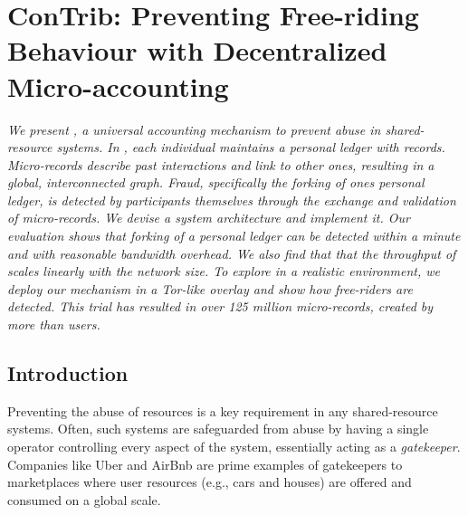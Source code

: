 \chapter{ConTrib: Preventing Free-riding Behaviour with Decentralized Micro-accounting}
\label{chapter2}

\emph{We present \ModelName{}, a universal accounting mechanism to prevent abuse in shared-resource systems.
In \ModelName{}, each individual maintains a personal ledger with \emph{records}.
Micro-records describe past interactions and link to other ones, resulting in a global, interconnected graph.
Fraud, specifically the forking of ones personal ledger, is detected by participants themselves through the exchange and validation of micro-records.
We devise a system architecture and implement it.
Our evaluation shows that forking of a personal ledger can be detected within a minute and with reasonable bandwidth overhead.
We also find that that the throughput of \ModelName{} scales linearly with the network size.
To explore \ModelName{} in a realistic environment, we deploy our mechanism in a Tor-like overlay and show how free-riders are detected.
This trial has resulted in over 125 million micro-records, created by more than \TrialUsers{} users.}

\newpage

\section{Introduction}


Preventing the abuse of resources is a key requirement in any shared-resource systems.
Often, such systems are safeguarded from abuse by having a single operator controlling every aspect of the system, essentially acting as a \emph{gatekeeper}.
Companies like Uber and AirBnb are prime examples of gatekeepers to marketplaces where user resources (e.g., cars and houses) are offered and consumed on a global scale.

